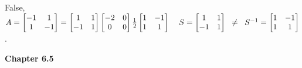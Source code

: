 \documentclass[10pt,twoside,reqno]{article}
\begin{document}
\begin{enumerate}
{%
{\addtolength{\leftskip}{5mm}
False, 
$
A=
\begin{bmatrix}
-1&1\\
1&-1\\
\end{bmatrix}
=
\begin{bmatrix}
1&1\\
-1&1\\
\end{bmatrix}
\begin{bmatrix}
-2&0\\
0&0\\
\end{bmatrix}
\frac{1}{2}
\begin{bmatrix}
1&-1\\
1&1\\
\end{bmatrix}
\hspace{4mm}
S=
\begin{bmatrix}
1&1\\
-1&1\\
\end{bmatrix}
\hspace{2mm}
\neq
\hspace{2mm}
S^{-1}=
\begin{bmatrix}
1&-1\\
1&1\\
\end{bmatrix}
$. \\
}
\vspace{3mm}
} 
\end{enumerate}
\vspace{5mm}
\textbf{Chapter 6.5}
\end{document}
